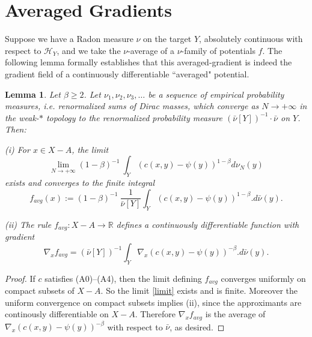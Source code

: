 \documentclass[12pt]{amsart}
\newtheorem{lem}{Lemma}
\theoremstyle{definition}
\theoremstyle{remark}
\newcommand{\bR}{\mathbb{R}}
\begin{document}















\section{Averaged Gradients} 
Suppose we have a Radon measure $\nu$ on the target $Y$, absolutely continuous with respect to $\mathscr{H}_Y$, and we take the $\nu$-average of a $\nu$-family of potentials $f$. The following lemma formally establishes that this averaged-gradient is indeed the gradient field of a continuously differentiable ``averaged" potential. 

\begin{lem}\label{avgpot} 
Let $\beta\geq 2$. Let $\nu_1, \nu_2, \nu_3, \ldots$ be a sequence of empirical probability measures, i.e. renormalized sums of Dirac masses, which converge as $N\to +\infty$ in the weak-$*$ topology to the renormalized probability measure $(\bar{\nu}[Y])^{-1} \cdot \bar{\nu}$ on $Y$. Then:

(i) For $x\in X-A$, the limit \begin{equation}\label{limit}\lim_{N\to +\infty} (1-\beta)^{-1}~ \int_Y (c(x,y) -\psi(y))^{1-\beta} d\nu_N(y)\end{equation} exists and converges to the finite integral \begin{equation}\label{favg} f_{avg}(x):=(1-\beta)^{-1}~\frac{1}{\bar{\nu}[Y]} \int_Y (c(x,y)-\psi(y))^{1-\beta}. d\bar{\nu}(y).\end{equation} 

(ii) The rule $f_{avg}: X-A \to \bR$ defines a continuously differentiable function with gradient $$\nabla_x f_{avg}=(\bar{\nu}[Y])^{-1} \int _Y \nabla_x (c(x,y)-\psi(y))^{-\beta}.d\bar{\nu}(y).$$ 
\end{lem}

\begin{proof}
If $c$ satisfies (A0)--(A4), then the limit defining $f_{avg}$ converges uniformly on compact subsets of $X-A$. So the limit \eqref{limit} exists and is finite. Moreover the uniform convergence on compact subsets implies (ii), since the approximants are continously differentiable on $X-A$. Therefore $\nabla_x f_{avg}$ is the average of $\nabla_x (c(x,y)-\psi(y))^{-\beta}$ with respect to $\bar{\nu}$, as desired.  
\end{proof}
\end{document}
